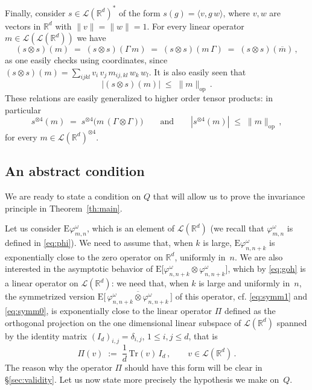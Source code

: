 \documentclass[a4paper,reqno,11pt]{amsart}
\numberwithin{equation}{section}
\newcommand{\cL}{{\ensuremath{\mathcal L}} }
\newcommand{\gd}{\delta}
\newcommand{\go}{\omega}
\newcommand{\R}{\mathbb{R}}
\def\bE{\ensuremath{\bs{\mathrm{E}}}}
\def\bs{\boldsymbol}
\renewcommand{\phi}{\varphi}
\begin{document}
Finally, consider $s \in \cL(\R^d)^*$ of the form
$s(g) = \langle v, g\, w \rangle$, where $v, w$
are vectors in $\R^d$ with $\| v \| = \|w \| = 1$.
For every linear operator $m\in \cL(\cL(\R^d))$ we have
\begin{equation} \label{eq:symm2}
	(s \otimes s)(m) \;=\; (s \otimes s)(\Gamma \,m) \;=\; (s \otimes s)(m \, \Gamma)
	 \;=\; (s \otimes s)(\overline m) \,,
\end{equation}
as one easily checks using coordinates, since
$(s \otimes s)(m) = \sum_{ijkl} v_i \, v_j \, m_{ij,kl} \,  w_k \, w_l$.
It is also easily seen that
\begin{equation} \label{eq:two}
|(s \otimes s)(m)| \; \le \; \| m\|_{\text{op}} \,.
\end{equation}
These relations are easily generalized to higher order tensor products: in particular
\begin{equation} \label{eq:k}
	s^{\otimes 4}(m)
	\;=\; s^{\otimes 4} \big( m \, (\Gamma \otimes \Gamma) \big)
	\qquad \text{and} \qquad
	| s^{\otimes 4}(m) | \;\le\; \| m \|_{\text{op}}\,,
\end{equation}
for every $m \in \cL(\R^d)^{\otimes 4}$.



\smallskip

\subsection{An abstract condition}

We are ready to state a condition on $Q$ that
will allow us to
prove the invariance principle in Theorem~\ref{th:main}.

Let us consider $\bE \phi^\go_{m,n}$, which is an element of $\cL(\R^d)$
(we recall that $\phi^\go_{m,n}$ is defined in \eqref{eq:phi}). We need to assume
that, when $k$ is large, $\bE \phi^\go_{n,n+k}$
is exponentially close to the zero operator on $\R^d$, uniformly in~$n$.
We are also interested in the asymptotic behavior of
$\bE \big[ \phi^{\go}_{n,n+k} \otimes \phi^{\go}_{n,n+k} \big]$,
which by \eqref{eq:goh} is a linear operator on $\cL(\R^d)$: we need that,
when $k$ is large and uniformly in~$n$,
the symmetrized version
$\bE \big[\, \overline{\phi^{\go}_{n,n+k} \otimes \phi^{\go}_{n,n+k}} \, \big]$
of this operator, cf. \eqref{eq:symm1} and \eqref{eq:symm0}, is exponentially close
to the linear operator $\Pi$ defined as
the orthogonal projection on the one dimensional
linear subspace of $\cL(\R^d)$ spanned by the identity matrix $(I_d)_{i,j} = \gd_{i,j}$,
$1 \le i,j \le d$, that is
\begin{equation} \label{eq:Pi}
	\Pi(v) \;:=\; \frac 1d \, \text{Tr}(v) \, I_d\,, \qquad
	v \in \cL(\R^d)\,.
\end{equation}
The reason why the operator $\Pi$ should have this form will be clear in \S\ref{sec:validity}.
Let us now state more precisely the hypothesis we make on~$Q$.
\end{document}
